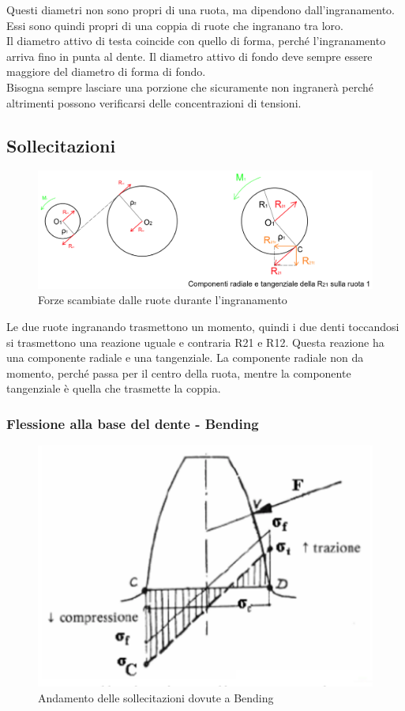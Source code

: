 Questi diametri non sono propri di una ruota, ma dipendono dall’ingranamento. Essi sono quindi propri di una coppia di ruote che ingranano tra loro.\\
Il diametro attivo di testa coincide con quello di forma, perché l’ingranamento arriva fino in punta al dente. Il diametro attivo di fondo deve sempre essere maggiore del diametro di forma di fondo.\\
Bisogna sempre lasciare una porzione che sicuramente non ingranerà perché altrimenti possono verificarsi delle concentrazioni di tensioni.
\subsection{Sollecitazioni}
\begin{figure}[h]
    \centering
    \includegraphics[scale=0.6]{Immagini/ForzeTrasmesse.png}
    \caption{Forze scambiate dalle ruote durante l'ingranamento}
    \label{fig:ForzeTrasmesse}
\end{figure}

Le due ruote ingranando trasmettono un momento, quindi i due denti toccandosi si trasmettono una reazione
uguale e contraria R21 e R12.
Questa reazione ha una componente radiale e una tangenziale.
La componente radiale non da momento, perché passa per il centro della ruota, mentre  la componente tangenziale è quella che trasmette la coppia.
\newpage
\subsubsection{Flessione alla base del dente - Bending}
\begin{figure}[h]
    \centering
    \includegraphics[scale=0.7]{Immagini/Bending1.png}
    \caption{Andamento delle sollecitazioni dovute a Bending}
    \label{fig:Bending1}
\end{figure}

